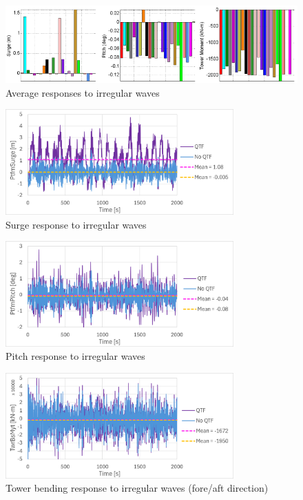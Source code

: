 \documentclass[a4paper, 11pt]{article}
\begin{document}
\begin{figure}[H]
    \centering
    \includegraphics[width=1\textwidth]{2.2.png}
    \caption{\small Average responses to irregular waves \cite{Robertson2014}}
    \label{fig:2.2}
\end{figure}

\begin{figure}[H]
    \centering
    \includegraphics[width=0.78\textwidth]{2.2_surge.png}
    \caption{\small Surge response to irregular waves}
    \label{fig:2.2_surge}
\end{figure}

\begin{figure}[H]
    \centering
    \includegraphics[width=0.78\textwidth]{2.2_pitch.png}
    \caption{\small Pitch response to irregular waves}
    \label{fig:2.2_pitch}
\end{figure}

\begin{figure}[H]
    \centering
    \includegraphics[width=0.78\textwidth]{2.2_twr.png}
    \caption{\small Tower bending response to irregular waves (fore/aft direction)}
    \label{fig:2.2_twr}
\end{figure}
\end{document}
